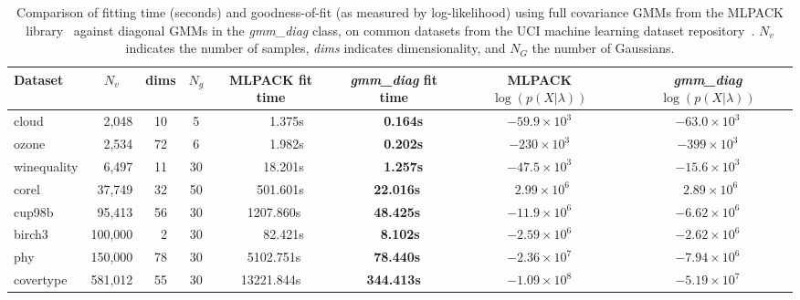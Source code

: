 % 
% 
% 



\begin{table}[!tb]
\vspace{5ex}
\centering
\small
\begin{tabular}{|l|c|c|c|c|c|c|c|}
\hline
{\bf Dataset} & {\bf $N_v$} & {\bf dims} & {\bf $N_g$} & {\bf MLPACK fit time} & {\bfseries {\it\bfseries gmm\_diag} fit time} & {\bf MLPACK $\log(p(X|\lambda))$} & {\bf {\it\bfseries gmm\_diag} $\log(p(X|\lambda))$} \\
\hline
  cloud       & ~~2,048 & 10 &  5 & ~~~~~1.375s & ~~~{\bf 0.164s} & $-59.9  \times 10^{3}$ & $-63.0  \times 10^{3}$ \\
  ozone       & ~~2,534 & 72 &  6 & ~~~~~1.982s & ~~~{\bf 0.202s} & $-230   \times 10^{3}$ & $-399   \times 10^{3}$ \\
  winequality & ~~6,497 & 11 & 30 & ~~~~18.201s & ~~~{\bf 1.257s} & $-47.5  \times 10^{3}$ & $-15.6  \times 10^{3}$ \\
  corel       & ~37,749 & 32 & 50 & ~~~501.601s &  ~{\bf 22.016s} & $~~2.99 \times 10^{6}$ & $~~2.89 \times 10^{6}$ \\
  cup98b      & ~95,413 & 56 & 30 &  ~1207.860s &  ~{\bf 48.425s} & $-11.9  \times 10^{6}$ & $-6.62  \times 10^{6}$ \\
  birch3      & 100,000 & ~2 & 30 & ~~~~82.421s &  ~~{\bf 8.102s} & $-2.59  \times 10^{6}$ & $-2.62  \times 10^{6}$ \\
  phy         & 150,000 & 78 & 30 &  ~5102.751s &  ~{\bf 78.440s} & $-2.36  \times 10^{7}$ & $-7.94  \times 10^{6}$ \\
  covertype   & 581,012 & 55 & 30 &  13221.844s &  {\bf 344.413s} & $-1.09  \times 10^{8}$ & $-5.19  \times 10^{7}$ \\
\hline
\end{tabular}
\caption
  {
  Comparison of fitting time (seconds) and goodness-of-fit (as measured by log-likelihood) using full covariance GMMs from the MLPACK library~\cite{Curtin_2013}
  against diagonal GMMs in the {\it gmm\_diag} class,
  on common datasets from the UCI machine learning dataset repository~\cite{Lichman_2013}.
  $N_v$ indicates the number of samples, {\it dims} indicates dimensionality, and $N_G$ the number of Gaussians.
  }
\label{tab:results}
\end{table}

